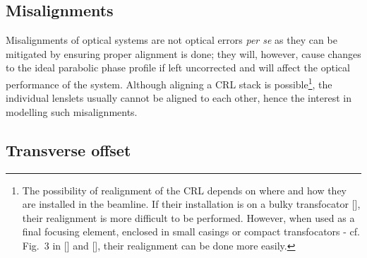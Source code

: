 \begin{refsection}
\section{Misalignments}\label{sec:misalignments}

Misalignments of optical systems are not optical errors \textit{per se} as they can be mitigated by ensuring proper alignment is done; they will, however, cause changes to the ideal parabolic phase profile if left uncorrected and will affect the optical performance of the system. Although aligning a CRL stack is possible\footnote{The possibility of realignment of the CRL depends on where and how they are installed in the beamline. If their installation is on a bulky transfocator [\cite{Vaughan2011}], their realignment is more difficult to be performed. However, when used as a final focusing element, enclosed in small casings or compact transfocators - cf. Fig.~3 in [\cite{Lengeler1999}] and [\cite{Kornemann2017, Narikovich2019}], their realignment can be done more easily.}, the individual lenslets usually cannot be aligned to each other, hence the interest in modelling such misalignments.

\subsection{Transverse offset}\label{sec:trans_lens}


\end{refsection}
